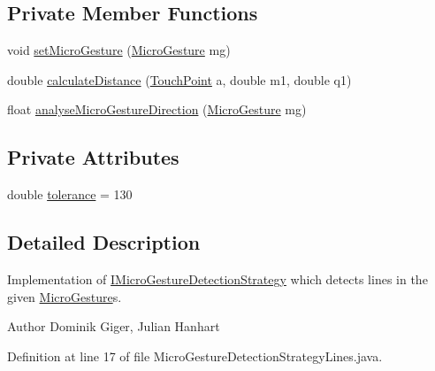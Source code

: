 \subsection*{Private Member Functions}
\begin{DoxyCompactItemize}
\item 
void \hyperlink{classch_1_1zhaw_1_1ba10__bsha__1_1_1strategies_1_1MicroGestureDetectionStrategyLines_ae2fe4b45825de8b32bd93848a6ecac12}{setMicroGesture} (\hyperlink{classch_1_1zhaw_1_1ba10__bsha__1_1_1service_1_1MicroGesture}{MicroGesture} mg)
\item 
double \hyperlink{classch_1_1zhaw_1_1ba10__bsha__1_1_1strategies_1_1MicroGestureDetectionStrategyLines_a752e22e2803dd97ddea5ce9ba6ce9071}{calculateDistance} (\hyperlink{classch_1_1zhaw_1_1ba10__bsha__1_1_1TouchPoint}{TouchPoint} a, double m1, double q1)
\item 
float \hyperlink{classch_1_1zhaw_1_1ba10__bsha__1_1_1strategies_1_1MicroGestureDetectionStrategyLines_a3eed9607540b8b73f0dd0f77b841a9c7}{analyseMicroGestureDirection} (\hyperlink{classch_1_1zhaw_1_1ba10__bsha__1_1_1service_1_1MicroGesture}{MicroGesture} mg)
\end{DoxyCompactItemize}
\subsection*{Private Attributes}
\begin{DoxyCompactItemize}
\item 
double \hyperlink{classch_1_1zhaw_1_1ba10__bsha__1_1_1strategies_1_1MicroGestureDetectionStrategyLines_a05159d73fbedc92c3e806f38b1ac4c7d}{tolerance} = 130
\end{DoxyCompactItemize}


\subsection{Detailed Description}
Implementation of \hyperlink{interfacech_1_1zhaw_1_1ba10__bsha__1_1_1strategies_1_1IMicroGestureDetectionStrategy}{IMicroGestureDetectionStrategy} which detects lines in the given \hyperlink{}{MicroGesture}s.

\begin{DoxyAuthor}{Author}
Dominik Giger, Julian Hanhart 
\end{DoxyAuthor}


Definition at line 17 of file MicroGestureDetectionStrategyLines.java.

